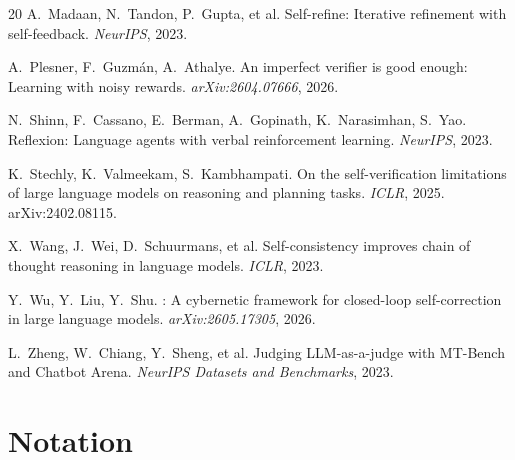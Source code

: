\documentclass[10pt]{article}
\begin{document}
\begin{thebibliography}{20}
A.~Madaan, N.~Tandon, P.~Gupta, et al.
\newblock Self-refine: Iterative refinement with self-feedback.
\newblock \emph{NeurIPS}, 2023.

A.~Plesner, F.~Guzm\'an, A.~Athalye.
\newblock An imperfect verifier is good enough: Learning with noisy
rewards.
\newblock \emph{arXiv:2604.07666}, 2026.

N.~Shinn, F.~Cassano, E.~Berman, A.~Gopinath, K.~Narasimhan,
S.~Yao.
\newblock Reflexion: Language agents with verbal reinforcement
learning.
\newblock \emph{NeurIPS}, 2023.

K.~Stechly, K.~Valmeekam, S.~Kambhampati.
\newblock On the self-verification limitations of large language
models on reasoning and planning tasks.
\newblock \emph{ICLR}, 2025. arXiv:2402.08115.

X.~Wang, J.~Wei, D.~Schuurmans, et al.
\newblock Self-consistency improves chain of thought reasoning in
language models.
\newblock \emph{ICLR}, 2023.

Y.~Wu, Y.~Liu, Y.~Shu.
: A cybernetic framework for closed-loop
self-correction in large language models.
\newblock \emph{arXiv:2605.17305}, 2026.

L.~Zheng, W.~Chiang, Y.~Sheng, et al.
\newblock Judging {LLM}-as-a-judge with {MT}-Bench and Chatbot
Arena.
\newblock \emph{NeurIPS Datasets and Benchmarks}, 2023.

\end{thebibliography}

\appendix

\section{Notation}\label{app:notation}
\end{document}
